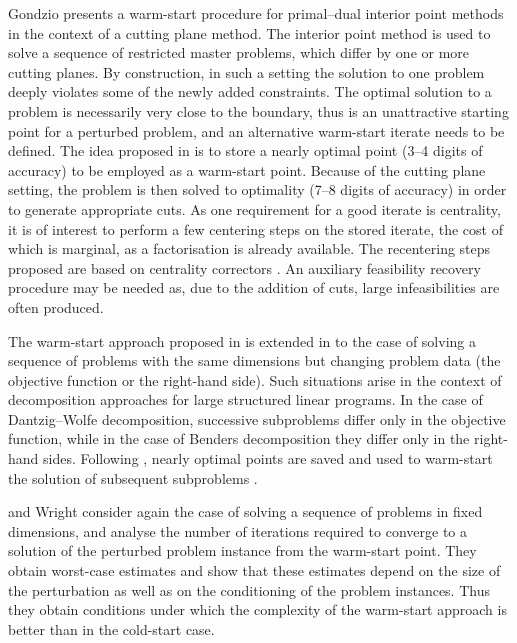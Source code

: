 Gondzio \cite{Gondzio98} presents a warm-start procedure for primal--dual
interior point methods in the context of a cutting plane method.
The interior point method is used to solve a sequence of restricted
master problems, which differ by one or more cutting planes.
By construction, in such a setting the solution to one problem
deeply violates some of the newly added constraints.
The optimal solution to a problem is necessarily very close 
to the boundary, thus is an unattractive starting point 
for a perturbed problem, and an alternative warm-start 
iterate needs to be defined.
The idea proposed in \cite{Gondzio98} is to store a nearly optimal 
point (3--4 digits of accuracy) to be employed as a warm-start point.
Because of the cutting plane setting, the problem is then solved to
optimality (7--8 digits of accuracy) in order to generate appropriate cuts.
As one requirement for a good iterate is centrality, it is of interest 
to perform a few centering steps on the stored iterate, the cost of 
which is marginal, as a factorisation is already available. The 
recentering steps proposed are based on
centrality correctors \cite{Gondzio96}.
An auxiliary feasibility recovery procedure may be needed as, due to 
the addition of cuts, large infeasibilities are often produced.

The warm-start approach proposed in \cite{Gondzio98} is extended
in \cite{GondzioVial} to the case of solving a sequence of problems 
with the same dimensions but changing problem data (the objective 
function or the right-hand side). Such situations arise 
in the context of decomposition approaches for large structured 
linear programs. 
In the case of Dantzig--Wolfe decomposition, successive subproblems 
differ only in the objective function, while in the case 
of Benders decomposition they differ only in the right-hand sides.
Following \cite{Gondzio98}, nearly optimal points are saved and used 
to warm-start the solution of subsequent subproblems \cite{GondzioVial}.


\yildirim and Wright \cite{YildirimWright} consider again the case 
of solving a sequence of problems in fixed dimensions, and
analyse the number of iterations required to converge to a 
solution of the perturbed problem instance from the warm-start point.
They obtain worst-case estimates and
show that these estimates depend on the size of the perturbation 
as well as on the conditioning of the problem 
instances. Thus they obtain conditions under which the complexity 
of the warm-start approach is better than in the cold-start case.

